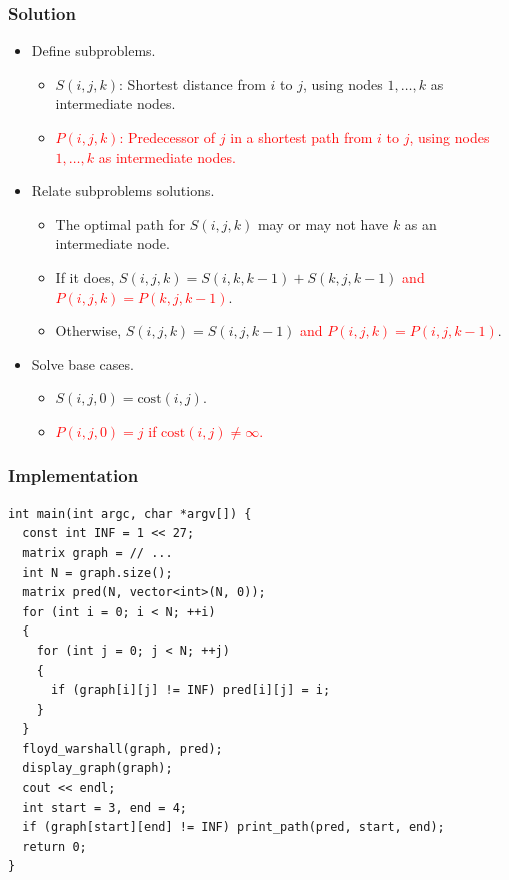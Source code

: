 \documentclass{beamer}
\begin{document}
\begin{frame}%
\frametitle{Solution}

\begin{itemize}

\item Define subproblems.
\begin{itemize}
\item<1-> $S(i, j, k)$: Shortest distance from $i$ to $j$, using nodes $1, \ldots, k$ as intermediate nodes.
\item<1-> \textcolor{red}{$P(i, j, k)$: Predecessor of $j$ in a shortest path from $i$ to $j$, using nodes $1, \ldots, k$ as intermediate nodes.}
\end{itemize}

\vspace{0.2cm}

\item<2-> Relate subproblems solutions.
\begin{itemize}
\item<2-> The optimal path for $S(i, j, k)$ may or may not have $k$ as an intermediate node.
\item<2-> If it does, $S(i, j, k) = S(i, k, k - 1) + S(k, j, k - 1)$ \textcolor{red}{and $P(i, j, k) = P(k, j, k - 1)$}.
\item<2-> Otherwise, $S(i, j, k) = S(i, j, k - 1)$ \textcolor{red}{and $P(i, j, k) = P(i, j, k - 1)$}.
\end{itemize}

\vspace{0.2cm}

\item<3-> Solve base cases.
\begin{itemize}
\item<3-> $S(i, j, 0) = \textrm{cost}(i, j)$.
\item<3-> \textcolor{red}{$P(i, j, 0) = j$ if $\textrm{cost}(i, j) \ne \infty$.}
\end{itemize}

\end{itemize}

\end{frame}

\begin{frame}[containsverbatim]
\frametitle{Implementation}

\scriptsize
\begin{lstlisting}
int main(int argc, char *argv[]) {
  const int INF = 1 << 27;
  matrix graph = // ...
  int N = graph.size();
  matrix pred(N, vector<int>(N, 0));
  for (int i = 0; i < N; ++i)
  {
    for (int j = 0; j < N; ++j)
    {
      if (graph[i][j] != INF) pred[i][j] = i;
    }
  }
  floyd_warshall(graph, pred);
  display_graph(graph);
  cout << endl;
  int start = 3, end = 4;
  if (graph[start][end] != INF) print_path(pred, start, end);
  return 0;
}
\end{lstlisting}

\end{frame}
\end{document}
